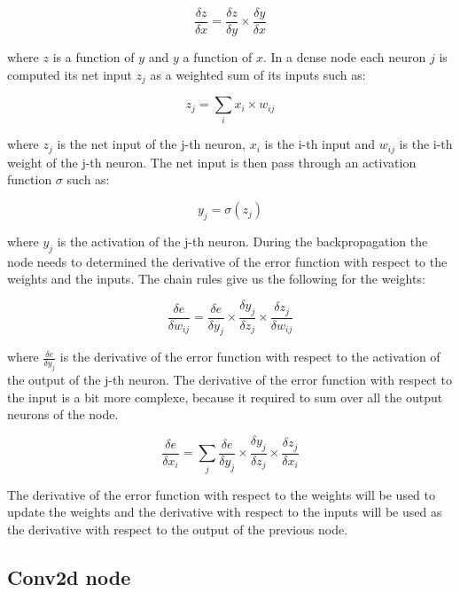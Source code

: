 \documentclass[11pt]{report}
\begin{document}
\begin{equation}
\frac{\delta z}{\delta x} = \frac{\delta z}{\delta y} \times \frac{\delta y}{\delta x}
\end{equation}

\noindent where $z$ is a function of $y$ and $y$ a function of $x$. In a dense node each neuron $j$ is computed its net input $z_j$ as a weighted sum of its inputs such as:

\begin{equation}
z_j = \sum_{i}{x_i \times w_{ij}}
\end{equation}

\noindent where $z_j$ is the net input of the j-th neuron, $x_i$ is the i-th input and $w_{ij}$ is the i-th weight of the j-th neuron. The net input is then pass through an activation function $\sigma$ such as:

\begin{equation}
y_j = \sigma(z_j)
\end{equation}

\noindent where $y_j$ is the activation of the j-th neuron. During the backpropagation the node needs to determined the derivative of the error function with respect to the weights and the inputs. The chain rules give us the following for the weights:

\begin{equation}
\frac{\delta e}{\delta w_{ij}} = \frac{\delta e}{\delta y_j} \times \frac{\delta y_j}{\delta z_j} \times \frac{\delta z_j}{\delta w_{ij}}
\end{equation}

\noindent where $\frac{\delta e}{\delta y_j}$ is the derivative of the error function with respect to the activation of the output of the j-th neuron. The derivative of the error function with respect to the input is a bit more complexe, because it required to sum over all the output neurons of the node.

\begin{equation}
\frac{\delta e}{\delta x_{i}} = \sum_{j} \frac{\delta e}{\delta y_j} \times \frac{\delta y_j}{\delta z_j} \times \frac{\delta z_j}{\delta x_i}
\end{equation}

\noindent The derivative of the error function with respect to the weights will be used to update the weights and the derivative with respect to the inputs will be used as the derivative with respect to the output of the previous node.

\subsection{Conv2d node} \label{sec:conv2d}
\end{document}

